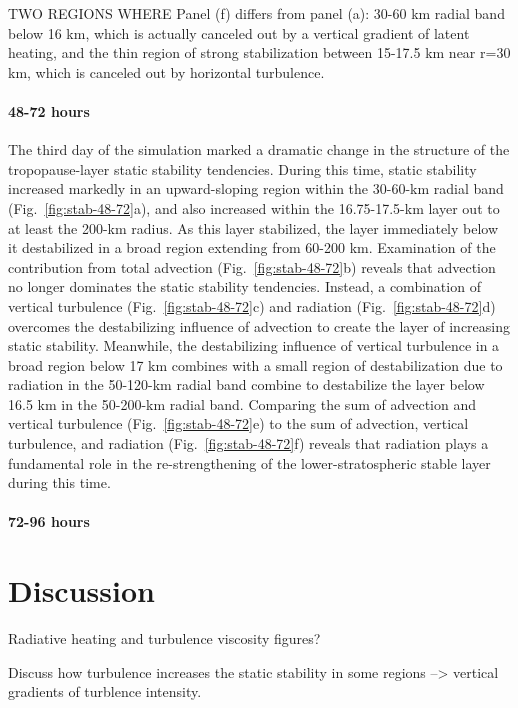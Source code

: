 \documentclass{ametsoc}
\begin{document}
TWO REGIONS WHERE Panel (f) differs from panel (a): 30-60 km radial band below 16 km, which is actually canceled out by a vertical gradient of latent heating, and the thin region of strong stabilization between 15-17.5 km near r=30 km, which is canceled out by horizontal turbulence.

\paragraph{48-72 hours}
The third day of the simulation marked a dramatic change in the structure of the tropopause-layer static stability tendencies. During this time, static stability increased markedly in an upward-sloping region within the 30-60-km radial band (Fig.~\ref{fig:stab-48-72}a), and also increased within the 16.75-17.5-km layer out to at least the 200-km radius.
As this layer stabilized, the layer immediately below it destabilized in a broad region extending from 60-200 km.
Examination of the contribution from total advection (Fig.~\ref{fig:stab-48-72}b) reveals that advection no longer dominates the static stability tendencies.
Instead, a combination of vertical turbulence (Fig.~\ref{fig:stab-48-72}c) and radiation (Fig.~\ref{fig:stab-48-72}d) overcomes the destabilizing influence of advection to create the layer of increasing static stability.
Meanwhile, the destabilizing influence of vertical turbulence in a broad region below 17 km combines with a small region of destabilization due to radiation in the 50-120-km radial band combine to destabilize the layer below 16.5 km in the 50-200-km radial band.
Comparing the sum of advection and vertical turbulence (Fig.~\ref{fig:stab-48-72}e) to the sum of advection, vertical turbulence, and radiation (Fig.~\ref{fig:stab-48-72}f) reveals that radiation plays a fundamental role in the re-strengthening of the lower-stratospheric stable layer during this time.

\paragraph{72-96 hours}

  \section{Discussion}

Radiative heating and turbulence viscosity figures?

Discuss how turbulence increases the static stability in some regions --> vertical gradients of turblence intensity.
\end{document}
